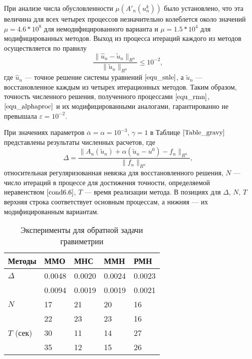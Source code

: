 При анализе числа обусловленности $\mu(A'_n(u_n^k))$ было установлено, что эта величина для всех четырех процессов незначительно колеблется около значений $\mu=4.6 * 10^{8}$ для немодифицированного варианта и $\mu=1.5 * 10^{4}$ для модифицированных методов. Выход из процесса итераций каждого из методов осуществляется по правилу
\begin{equation}\label{cond6.6}
\frac{\|\hat{u}_n-\tilde{u}_n\|_{R^n}}{\|\tilde{u}_n\|_{R^n}}\le 10^{-2},
\end{equation}
где $\hat{u}_n$ --- точное решение системы уравнений $\eqref{equ_snle}$, а $\tilde{u}_n$ --- восстановленное каждым из четырех итерационных методов. Таким образом, точность численного решения, полученного процессами $\eqref{equ_rmn}$, $\eqref{equ_alphaproc}$ и их модифицированными аналогами, гарантированно не превышала $\varepsilon=10^{-2}$.

При значениях параметров $\bar\alpha=\alpha=10^{-3}$, $\gamma=1$ в Таблице $\ref{Table_gravy}$ представлены результаты численных расчетов, где
\begin{equation}\label{form6.7}
\Delta=\frac{\|A_n(\tilde{u}_n)+\alpha(\tilde{u}_n-u^0)-f_n\|_{R^n}}{\|f_n\|_{R^n}},
\end{equation}
относительная регуляризованная невязка для восстановленного решения, $N$ --- число итераций в процессе для достижения точности, определяемой неравенством $\eqref{cond6.6}$, $T$ --- время реализации метода. В позициях для $\Delta$, $N$, $T$ верхняя строка соответствует основным процессам, а нижняя --- их модифицированным вариантам.
\begin{table}[h]
	\centering
	\caption{Эксперименты для обратной задачи гравиметрии}
	\label{Table_gravy}
	\begin{tabular}{|p{}|p{}|p{}|p{}|p{}|}
		\hline
		\rule{0cm}{0.5cm}
		\textbf{Методы} & \textbf{ММО} & \textbf{МНС} & \textbf{ММН} & \textbf{РМН} \\ \hline
		\rule{0cm}{0.5cm}
		{$\Delta$} & 0.0048 & 0.0020 & 0.0024 & 0.0023	 \\ \cline{2-5} 
		\rule{0cm}{0.5cm}
		&  0.0094   & 0.0019    &  0.0019   &  0.0021   \\ \hline
		\rule{0cm}{0.5cm}
		{$N$} & 17  &  21   &   20  &  16    \\ \cline{2-5}
		\rule{0cm}{0.5cm}
		&  22   &   23  &  23   &  16   \\ \hline
		\rule{0cm}{0.5cm}
		{$T$ (сек)}    &  30   &  11   &  14  & 27    \\ \cline{2-5}
		\rule{0cm}{0.5cm}
		& 35   & 12    &  15   &   26  \\ \hline
	\end{tabular}
\end{table}

